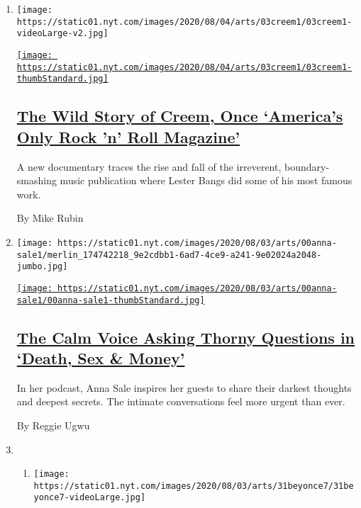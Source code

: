 \begin{enumerate}
\def\labelenumi{\arabic{enumi}.}
\item
  \texttt{[image: https://static01.nyt.com/images/2020/08/04/arts/03creem1/03creem1-videoLarge-v2.jpg]}

  \href{/2020/08/03/arts/music/creem-magazine-documentary.html}{\texttt{[image: https://static01.nyt.com/images/2020/08/04/arts/03creem1/03creem1-thumbStandard.jpg]}}

  \hypertarget{the-wild-story-of-creem-once-americas-only-rock-n-roll-magazine}{%
  \subsection{\texorpdfstring{\href{/2020/08/03/arts/music/creem-magazine-documentary.html}{The
  Wild Story of Creem, Once `America's Only Rock 'n' Roll
  Magazine'}}{The Wild Story of Creem, Once `America's Only Rock 'n' Roll Magazine'}}\label{the-wild-story-of-creem-once-americas-only-rock-n-roll-magazine}}

  A new documentary traces the rise and fall of the irreverent,
  boundary-smashing music publication where Lester Bangs did some of his
  most famous work.

  By Mike Rubin
\item
  \texttt{[image: https://static01.nyt.com/images/2020/08/03/arts/00anna-sale1/merlin\_174742218\_9e2cdbb1-6ad7-4ce9-a241-9e02024a2048-jumbo.jpg]}

  \href{/2020/08/02/arts/anna-sale-death-sex-money-podcast.html}{\texttt{[image: https://static01.nyt.com/images/2020/08/03/arts/00anna-sale1/00anna-sale1-thumbStandard.jpg]}}

  \hypertarget{the-calm-voice-asking-thorny-questions-in-death-sex--money}{%
  \subsection{\texorpdfstring{\href{/2020/08/02/arts/anna-sale-death-sex-money-podcast.html}{The
  Calm Voice Asking Thorny Questions in `Death, Sex \&
  Money'}}{The Calm Voice Asking Thorny Questions in `Death, Sex \& Money'}}\label{the-calm-voice-asking-thorny-questions-in-death-sex--money}}

  In her podcast, Anna Sale inspires her guests to share their darkest
  thoughts and deepest secrets. The intimate conversations feel more
  urgent than ever.

  By Reggie Ugwu
\item
  \begin{enumerate}
  \def\labelenumii{\arabic{enumii}.}
  \item
    \texttt{[image: https://static01.nyt.com/images/2020/08/03/arts/31beyonce7/31beyonce7-videoLarge.jpg]}


\end{enumerate}
\end{enumerate}
